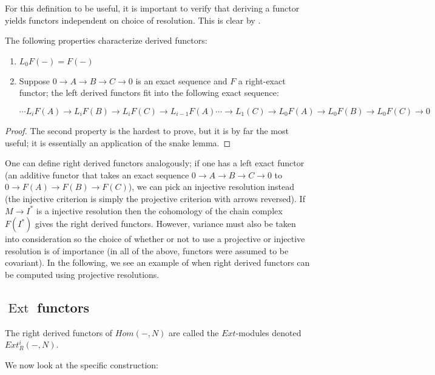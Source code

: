For this definition to be useful, it is important to verify that
deriving a functor yields functors independent on choice of
resolution. This is clear by \rref{}.

\begin{theorem} The following properties characterize derived
functors: \begin{enumerate}
\item{ $L_0F(-)=F(-)$ }
\item{ Suppose $0\rightarrow A\rightarrow B\rightarrow
C\rightarrow 0$ is an exact sequence and $F$ a right-exact
functor; the left derived functors fit into the following exact
sequence:

\begin{equation} \cdots L_iF(A)\rightarrow L_iF(B)\rightarrow
L_iF(C)\rightarrow L_{i-1}F(A)\cdots\rightarrow
L_1(C)\rightarrow L_0F(A)\rightarrow L_0F(B)\rightarrow
L_0F(C)\rightarrow 0 \end{equation}}
\end{enumerate}
\end{theorem}
\begin{proof} The second property is the hardest to prove, but
it is by far the most useful; it is essentially an application
of the snake lemma. \end{proof}
One can define right derived functors analogously; if one has a
left exact functor (an additive functor that takes an exact
sequence $0\rightarrow A\rightarrow B\rightarrow C\rightarrow 0$ to
$0\rightarrow F(A)\rightarrow F(B)\rightarrow F(C)$), we can
pick an injective resolution instead (the injective criterion is simply the
projective criterion with arrows reversed). If
$M\rightarrow I^*$ is a injective resolution then the cohomology of the chain
complex $F(I^*)$ gives the right derived functors.
However, variance must also be taken into consideration so the
choice of whether or not to use a projective or injective
resolution is of importance (in all of the above, functors were
assumed to be covariant). In the following, we see an example of when right
derived functors can be computed using projective
resolutions.

\newcommand{\ext}{\operatorname{Ext}}
\subsection{$\ext$ functors}

\begin{definition} The right derived functors of $Hom(-,N)$ are
called the $Ext$-modules denoted $Ext^i_R(-,N)$.
\end{definition}
We now look at the specific construction:

